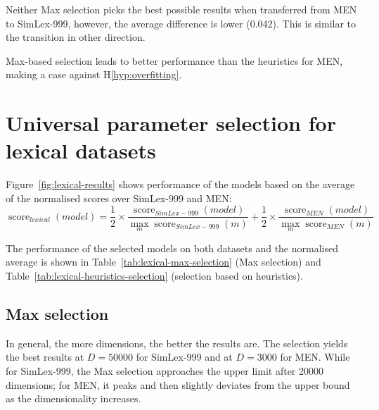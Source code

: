 Neither Max selection picks the best possible results when transferred from MEN to SimLex-999, however, the average difference is lower (0.042). This is similar to the transition in other direction.
%
%
%

Max-based selection leads to better performance than the heuristics for MEN, making a case against H\ref{hyp:overfitting}.

\section{Universal parameter selection for lexical datasets}
\label{sec:universal-lexical-param-selection}



Figure~\ref{fig:lexical-results} shows performance of the models based on the average of the normalised scores over SimLex-999 and MEN:
%
%
$$
\operatorname{score}_\mathit{lexical}(\mathit{model}) =%
\frac{1}{2}\times%
\frac{\operatorname{score}_\mathit{SimLex-999}(\mathit{model})}%
{\max_m\operatorname{score}_\mathit{SimLex-999}(m)}%
+%
\frac{1}{2}\times%
\frac{\operatorname{score}_\mathit{MEN}(\mathit{model})}%
{\max_m\operatorname{score}_\mathit{MEN}(m)}%
$$

The performance of the selected models on both datasets and the normalised average is shown in Table~\ref{tab:lexical-max-selection} (Max selection) and Table~\ref{tab:lexical-heuristics-selection} (selection based on heuristics).



\subsection{Max selection}
\label{sec:max-selection}

In general, the more dimensions, the better the results are. The selection yields the best results at $D = 50000$ for SimLex-999 and at $D = 3000$ for MEN. While for SimLex-999,  the Max selection approaches the upper limit after 20000 dimensions; for MEN, it peaks and then slightly deviates from the upper bound as the dimensionality increases.
%
%

